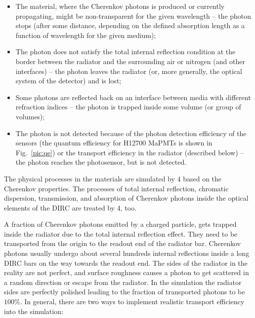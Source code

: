 \begin{itemize}
\item The material, where the Cherenkov photons is produced or currently propagating, might be non-transparent for the given wavelength -- the photon stops (after some distance, depending on the defined absorption length as a function of wavelength for the given medium);
\item The photon does not satisfy the total internal reflection condition at the border between the radiator and the surrounding air or nitrogen (and other interfaces) -- the photon leaves the radiator (or, more generally, the optical system of the detector) and is lost;
\item Some photons are reflected back on an interface between media with different refraction indices -- the photon is trapped inside some volume (or group of volumes);
\item The photon is not detected because of the photon detection efficiency of the sensors (the quantum efficiency for H12700 MaPMTs is shown in Fig.~\ref{pic:qe}) or the transport efficiency in the radiator (described below)  -- the photon reaches the photosensor, but is not detected.
\end{itemize}

The physical processes in the materials are simulated by {\geant}4 based on the Cherenkov properties. The processes of total internal reflection, chromatic dispersion, transmission, and absorption of Cherenkov photons inside the optical elements of the \gluex DIRC are treated by {\geant}4, too.

A fraction of Cherenkov photons emitted by a charged particle, gets trapped inside the radiator due to the total internal reflection effect. They need to be transported from the origin to the readout end of the radiator bar. Cherenkov photons usually undergo about several hundreds internal reflections inside a long \babar DIRC bars on the way towards the readout end. The sides of the radiator in the reality are not perfect, and surface roughness causes a photon to get scattered in a random direction or escape from the radiator. In the simulation the radiator sides are perfectly polished leading to the fraction of transported photons to be $100\%$. In general, there are two ways to implement realistic transport efficiency into the simulation:

